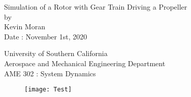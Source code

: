 \documentclass[letterpaper,12pt]{article}
\begin{document}
\begin{titlepage}
 \begin{center}
 \vspace*{1in}
{\Huge Simulation of a Rotor with Gear Train Driving a Propeller}\\
    \bigskip
    by\\
    \bigskip
    {\Large Kevin Moran} \\
    \bigskip
    Date : November 1st, 2020

    \bigskip\bigskip\bigskip
    University of Southern California\\
    Aerospace and Mechanical Engineering Department\\
    AME 302 : System Dynamics
 \end{center}
\end{titlepage}

\begin{figure}
    \centering
    \texttt{[image: Test]}
    \label{Test}
\end{figure}
\end{document}
